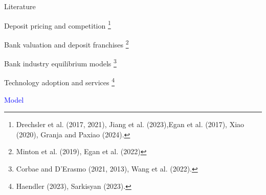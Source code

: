 \documentclass[notes,10pt, aspectratio=169]{beamer}
\newenvironment{wideitemize}{\itemize\addtolength{\itemsep}{10pt}}{\enditemize}
\begin{document}
    \begin{frame}{Literature}
    \begin{wideitemize}
        \item Deposit pricing and competition \footnote{ Drechsler et al. (2017, 2021), Jiang et al. (2023),Egan et al. (2017), Xiao (2020),
        Granja and Paxiao (2024).}
        \item Bank valuation and deposit franchises \footnote{Minton et al. (2019), Egan et al. (2022)}
        \item Bank industry equilibrium models \footnote{Corbae and D’Erasmo (2021, 2013), Wang et al. (2022).}
        \item Technology adoption and services \footnote{Haendler (2023), Sarkisyan (2023).}

    \end{wideitemize}
    \end{frame}
    
    


\begin{frame}[noframenumbering]

    \huge \centering \textcolor{blue}{Model}
    
    \end{frame}
\end{document}
